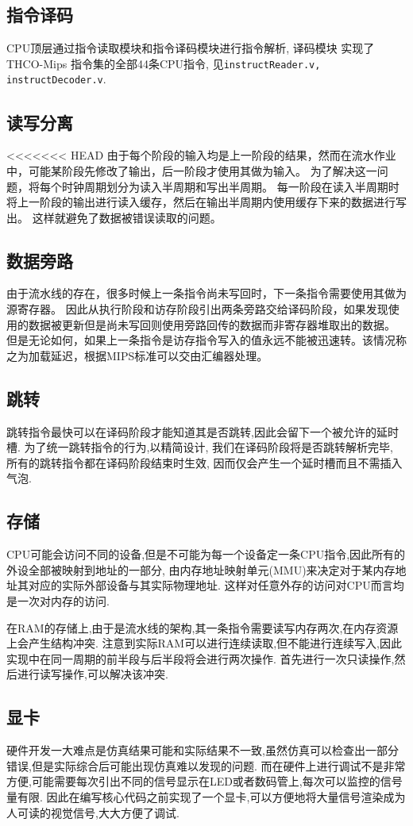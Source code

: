 \subsection{指令译码}
  CPU顶层通过指令读取模块和指令译码模块进行指令解析, 译码模块
  实现了THCO-Mips 指令集的全部44条CPU指令, 见\verb|instructReader.v, instructDecoder.v|.

  \subsection{读写分离}
<<<<<<< HEAD
    由于每个阶段的输入均是上一阶段的结果，然而在流水作业中，可能某阶段先修改了输出，后一阶段才使用其做为输入。
    为了解决这一问题，将每个时钟周期划分为读入半周期和写出半周期。
    每一阶段在读入半周期时将上一阶段的输出进行读入缓存，然后在输出半周期内使用缓存下来的数据进行写出。
    这样就避免了数据被错误读取的问题。
  \subsection{数据旁路}
    由于流水线的存在，很多时候上一条指令尚未写回时，下一条指令需要使用其做为源寄存器。
    因此从执行阶段和访存阶段引出两条旁路交给译码阶段，如果发现使用的数据被更新但是尚未写回则使用旁路回传的数据而非寄存器堆取出的数据。
    但是无论如何，如果上一条指令是访存指令写入的值永远不能被迅速转。该情况称之为加载延迟，根据MIPS标准可以交由汇编器处理。
  \subsection{跳转}
    跳转指令最快可以在译码阶段才能知道其是否跳转,因此会留下一个被允许的延时槽.
    为了统一跳转指令的行为,以精简设计, 我们在译码阶段将是否跳转解析完毕, 所有的跳转指令都在译码阶段结束时生效,
    因而仅会产生一个延时槽而且不需插入气泡.
  \subsection{存储}
    CPU可能会访问不同的设备,但是不可能为每一个设备定一条CPU指令,因此所有的外设全部被映射到地址的一部分,
    由内存地址映射单元(MMU)来决定对于某内存地址其对应的实际外部设备与其实际物理地址.
    这样对任意外存的访问对CPU而言均是一次对内存的访问.

    在RAM的存储上,由于是流水线的架构,其一条指令需要读写内存两次,在内存资源上会产生结构冲突.
    注意到实际RAM可以进行连续读取,但不能进行连续写入,因此实现中在同一周期的前半段与后半段将会进行两次操作.
    首先进行一次只读操作,然后进行读写操作,可以解决该冲突.
  \subsection{显卡}
    硬件开发一大难点是仿真结果可能和实际结果不一致,虽然仿真可以检查出一部分错误,但是实际综合后可能出现仿真难以发现的问题.
    而在硬件上进行调试不是非常方便,可能需要每次引出不同的信号显示在LED或者数码管上,每次可以监控的信号量有限.
    因此在编写核心代码之前实现了一个显卡,可以方便地将大量信号渲染成为人可读的视觉信号,大大方便了调试.
